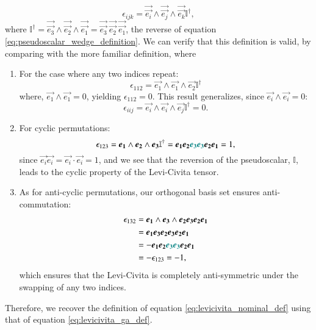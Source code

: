 \begin{equation}
    \label{eq:levicivita_ga_def}
    \epsilon_{ijk} = \vec{\vec{e_i}} \wedge \vec{\vec{e_j}} \wedge \vec{\vec{e_k}} \mathbb{I}^\dagger,
\end{equation}
where $\mathbb{I}^\dagger = \vec{\vec{e_3}} \wedge \vec{\vec{e_2}} \wedge \vec{\vec{e_1}} = \vec{\vec{e_3}} \ \vec{\vec{e_2}}  \ \vec{\vec{e_1}}  $, the reverse of equation \ref{eq:pseudoscalar_wedge_definition}.
We can verify that this definition is valid, by comparing with the more familiar definition, where
\begin{enumerate}
    \item For the case where any two indices repeat:
    $$ \epsilon_{112} = \vec{e_1} \wedge \vec{e_1} \wedge \vec{e_2} \mathbb{I}^\dagger $$
    where, $\vec{e_1} \wedge \vec{e_1} = 0$, yielding $ \epsilon_{112} = 0 $. This result generalizes, since $ \vec{e_i} \wedge \vec{e_i} = 0$:
    $$ \epsilon_{iij} =  \vec{e_i} \wedge \vec{e_i}  \wedge \vec{e_j} \mathbb{I}^\dagger = 0.$$

    \item For cyclic permutations:
    $$ \epsilon_{123} = \vec{e_1} \wedge \vec{e_2} \wedge \vec{e_3} \mathbb{I}^\dagger = \vec{e_1} \vec{e_2} \color{teal} \vec{e_3} \vec{e_3} \color{black}\vec{e_2} \vec{e_1} = 1, $$
    since $ \vec{e_i} \vec{e_i} = \vec{e_i} \cdot \vec{e_i} = 1$, and we see that the reversion of the pseudoscalar, $\mathbb{I}$, leads to the cyclic property of the Levi-Civita tensor.

    \item As for anti-cyclic permutations, our orthogonal basis set ensures anti-commutation:
    \begin{align*}
        \epsilon_{132} &= \vec{e_1} \wedge \vec{e_3} \wedge \vec{e_2} \vec{e_3} \vec{e_2} \vec{e_1} \\
        &= \vec{e_1} \vec{e_3} \vec{e_2} \vec{e_3} \vec{e_2} \vec{e_1} \\
        &= - \vec{e_1} \vec{e_2} \color{teal}\vec{e_3} \vec{e_3} \color{black} \vec{e_2} \vec{e_1} \\
        &= - \epsilon_{123} = -1,
    \end{align*}
    which ensures that the Levi-Civita is completely anti-symmetric under the swapping of any two indices.
    
\end{enumerate}
Therefore, we recover the definition of equation \eqref{eq:levicivita_nominal_def} using that of equation \eqref{eq:levicivita_ga_def}.

